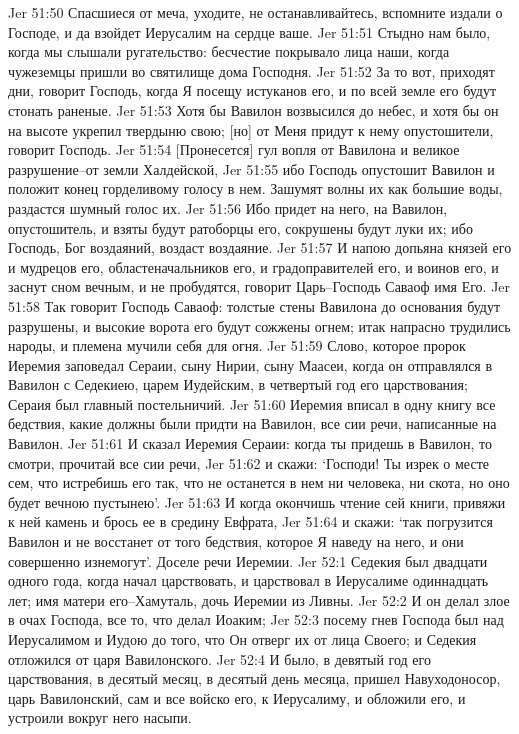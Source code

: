 Jer 51:50  Спасшиеся от меча, уходите, не останавливайтесь, вспомните издали о Господе, и да взойдет Иерусалим на сердце ваше.
Jer 51:51  Стыдно нам было, когда мы слышали ругательство: бесчестие покрывало лица наши, когда чужеземцы пришли во святилище дома Господня.
Jer 51:52  За то вот, приходят дни, говорит Господь, когда Я посещу истуканов его, и по всей земле его будут стонать раненые.
Jer 51:53  Хотя бы Вавилон возвысился до небес, и хотя бы он на высоте укрепил твердыню свою; [но] от Меня придут к нему опустошители, говорит Господь.
Jer 51:54  [Пронесется] гул вопля от Вавилона и великое разрушение--от земли Халдейской,
Jer 51:55  ибо Господь опустошит Вавилон и положит конец горделивому голосу в нем. Зашумят волны их как большие воды, раздастся шумный голос их.
Jer 51:56  Ибо придет на него, на Вавилон, опустошитель, и взяты будут ратоборцы его, сокрушены будут луки их; ибо Господь, Бог воздаяний, воздаст воздаяние.
Jer 51:57  И напою допьяна князей его и мудрецов его, областеначальников его, и градоправителей его, и воинов его, и заснут сном вечным, и не пробудятся, говорит Царь--Господь Саваоф имя Его.
Jer 51:58  Так говорит Господь Саваоф: толстые стены Вавилона до основания будут разрушены, и высокие ворота его будут сожжены огнем; итак напрасно трудились народы, и племена мучили себя для огня.
Jer 51:59  Слово, которое пророк Иеремия заповедал Сераии, сыну Нирии, сыну Маасеи, когда он отправлялся в Вавилон с Седекиею, царем Иудейским, в четвертый год его царствования; Сераия был главный постельничий.
Jer 51:60  Иеремия вписал в одну книгу все бедствия, какие должны были придти на Вавилон, все сии речи, написанные на Вавилон.
Jer 51:61  И сказал Иеремия Сераии: когда ты придешь в Вавилон, то смотри, прочитай все сии речи,
Jer 51:62  и скажи: `Господи! Ты изрек о месте сем, что истребишь его так, что не останется в нем ни человека, ни скота, но оно будет вечною пустынею'.
Jer 51:63  И когда окончишь чтение сей книги, привяжи к ней камень и брось ее в средину Евфрата,
Jer 51:64  и скажи: `так погрузится Вавилон и не восстанет от того бедствия, которое Я наведу на него, и они совершенно изнемогут'. Доселе речи Иеремии.
Jer 52:1  Седекия был двадцати одного года, когда начал царствовать, и царствовал в Иерусалиме одиннадцать лет; имя матери его--Хамуталь, дочь Иеремии из Ливны.
Jer 52:2  И он делал злое в очах Господа, все то, что делал Иоаким;
Jer 52:3  посему гнев Господа был над Иерусалимом и Иудою до того, что Он отверг их от лица Своего; и Седекия отложился от царя Вавилонского.
Jer 52:4  И было, в девятый год его царствования, в десятый месяц, в десятый день месяца, пришел Навуходоносор, царь Вавилонский, сам и все войско его, к Иерусалиму, и обложили его, и устроили вокруг него насыпи.
